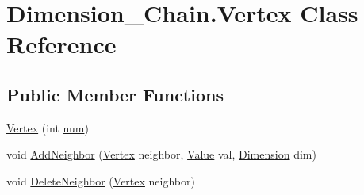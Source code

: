 \hypertarget{class_dimension___chain_1_1_vertex}{}\section{Dimension\+\_\+\+Chain.\+Vertex Class Reference}
\label{class_dimension___chain_1_1_vertex}
\subsection*{Public Member Functions}
\begin{DoxyCompactItemize}
\item 
\mbox{\hyperlink{class_dimension___chain_1_1_vertex_a57ae2d0098e07307070c4e140980527c}{Vertex}} (int \mbox{\hyperlink{class_dimension___chain_1_1_vertex_aa803e8c5e381e30ad498686633a3a4ae}{num}})
\item 
void \mbox{\hyperlink{class_dimension___chain_1_1_vertex_a027ea03e13737bce5e7de4fab41c828d}{Add\+Neighbor}} (\mbox{\hyperlink{class_dimension___chain_1_1_vertex}{Vertex}} neighbor, \mbox{\hyperlink{class_dimension___chain_1_1_value}{Value}} val, \mbox{\hyperlink{class_dimension___chain_1_1_dimension}{Dimension}} dim)
\item 
void \mbox{\hyperlink{class_dimension___chain_1_1_vertex_a912f3caec2dfba7f1e3f955ad20d1736}{Delete\+Neighbor}} (\mbox{\hyperlink{class_dimension___chain_1_1_vertex}{Vertex}} neighbor)
\end{DoxyCompactItemize}
